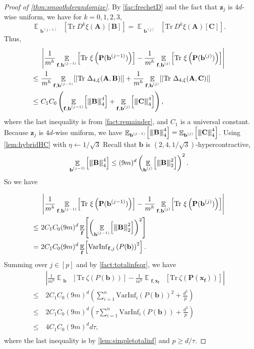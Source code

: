 \documentclass[11pt]{article}
\theoremstyle{plain}
\theoremstyle{definition}
\newcommand {\minusspace} {\: \! \!}
\newcommand {\Fn} [2] {\ensuremath{ #1 \minusspace \Br{ #2 } }}
\newcommand {\br} [1] {\ensuremath{ \left( #1 \right) }}
\newcommand {\Br} [1] {\ensuremath{ \left[ #1 \right] }}
\newcommand {\ab} [1] {\ensuremath{ \left| #1 \right| }}
\DeclareMathOperator*{\bigE}{\mathbb{E}}
\newcommand {\expec} [2] {\Fn{\bigE_{\substack{#1}}}{#2}}
\newcommand{\nnorm}[1]{{\left\vert\kern-0.25ex\left\vert\kern-0.25ex\left\vert #1
		\right\vert\kern-0.25ex\right\vert\kern-0.25ex\right\vert}}
\newcommand {\Tr} {\ensuremath{ \mathrm{Tr} }}
\newcommand{\randP}{\ensuremath{\mathbf{P}}}
\newcommand{\randb}{\ensuremath{\mathbf{b}}}
\newcommand{\randz}{\ensuremath{\mathbf{z}}}
\newcommand{\randx}{\ensuremath{\mathbf{x}}}
\newcommand{\randf}{\ensuremath{\mathbf{f}}}
\newcommand{\randA}{\ensuremath{\mathbf{A}}}
\newcommand{\randB}{\ensuremath{\mathbf{B}}}
\newcommand{\randC}{\ensuremath{\mathbf{C}}}
\newcommand{\varinfi}[1]{\ensuremath{\mathrm{VarInf}_i}\br{#1}}
\newcommand{\infrfj}[1]{\ensuremath{\mathrm{VarInf}_{\randf,j}}\br{#1}}
\newcommand{\1}{\mathbb{1}} %
\begin{document}
\begin{proof}[Proof of \cref{thm:smoothderandomize}]
By \cref{fac:frechetD} and the fact that $\randz_j$ is $4d$-wise uniform, we have for $k=0,1,2,3$, 
\[\expec{\randb^{(j-1)}}{\Tr~D^k\xi(\randA)\Br{\randB}}=\expec{\randb^{(j)}}{\Tr~D^k\xi(\randA)\Br{\randC}}.\]
Thus, 
\begin{align*}
&\ab{\frac{1}{m^h}\expec{\randf,\randb^{(j-1)}}{\Tr~\xi\br{\randP(\randb^{(j-1)})}}-\frac{1}{m^h}\expec{\randf,\randb^{(j)}}{\Tr~\xi\br{\randP(\randb^{(j)})}}}\\
\leq~&\frac{1}{m^h}\expec{\randf,\randb^{(j-1)}}{\ab{\Tr~\Delta_{4,\xi}(\randA,\randB)}}+\frac{1}{m^h}\expec{\randf,\randb^{(j)}}{\ab{\Tr~\Delta_{4,\xi}(\randA,\randC)}}\\
\leq~&C_1C_0\br{\expec{\randf,\randb^{(j-1)}}{\nnorm{\randB}_4^4}+\expec{\randf,\randb^{(j)}}{\nnorm{\randC}_4^4}},
\end{align*}
where the last inequality is from \cref{fact:remainder}, and $C_1$ is a universal constant. Because $\randz_j$ is $4d$-wise uniform, we have $\expec{\randb^{(j-1)}}{\nnorm{\randB}_4^4}=\expec{\randb^{(j)}}{\nnorm{\randC}_4^4}$. Using \cref{lem:hybridHC} with $\eta\gets1/\sqrt{3}$ Recall that $\randb$ is $(2,4,1/\sqrt{3})$-hypercontractive, \[\expec{\randb^{(j-1)}}{\nnorm{\randB}_4^4}\leq(9m)^d\br{\expec{\randb^{(j)}}{\nnorm{\randB}_2^2}}^2.\]
So we have 

\begin{align*}
&\ab{\frac{1}{m^h}\expec{\randf,\randb^{(j-1)}}{\Tr~\xi\br{\randP(\randb^{(j-1)})}}-\frac{1}{m^h}\expec{\randf,\randb^{(j)}}{\Tr~\xi\br{\randP(\randb^{(j)})}}}\\
\leq~&2C_1C_0(9m)^d\expec{\randf}{\br{\expec{\randb^{(j-1)}}{\nnorm{\randB}_2^2}}^2}\\
=~&2C_1C_0(9m)^d\expec{\randf}{\infrfj{P(\randb)}^2}.
\end{align*}
Summing over $j\in[p]$ and by \cref{fact:totalinfsqr}, we have
\begin{align*}
&\ab{\frac{1}{m^h}\expec{\randb}{\Tr~\zeta\br{P(\randb)}}-\frac{1}{m^h}\expec{\randf,\randx_\randf}{\Tr~\zeta\br{\randP(\randx_\randf)}}}\\\leq~&2C_1C_0(9m)^d\br{\sum_{i=1}^n\varinfi{P(\randb)}^2+\frac{d^2}{p}}\\
\leq~&2C_1C_0(9m)^d\br{\tau\sum_{i=1}^n\varinfi{P(\randb)}+\frac{d^2}{p}}\\
\leq~&4C_1C_0(9m)^dd\tau,\\
\end{align*}
where the last inequality is by \cref{lem:simpletotalinf} and $p\ge d/\tau$.
\end{proof}
\end{document}
